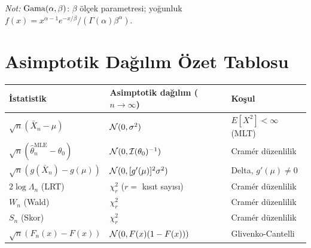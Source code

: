 \noindent\textit{Not:} $\operatorname{Gama}(\alpha,\beta)$: $\beta$ ölçek parametresi; yoğunluk $f(x)=x^{\alpha-1}e^{-x/\beta}/(\Gamma(\alpha)\beta^\alpha)$.

\section{Asimptotik Dağılım Özet Tablosu}
\label{app:asimptotik_tablo}

\begin{center}
\renewcommand{\arraystretch}{1.4}
\begin{tabular}{lll}
\hline
\textbf{İstatistik} & \textbf{Asimptotik dağılım} ($n\to\infty$) & \textbf{Koşul} \\
\hline
$\sqrt{n}(\bar X_n-\mu)$ & $\mathcal{N}(0,\sigma^2)$ & $E[X^2]<\infty$ (MLT) \\
$\sqrt{n}(\hat\theta_n^\mathrm{MLE}-\theta_0)$ & $\mathcal{N}(0,\mathcal{I}(\theta_0)^{-1})$ & Cramér düzenlilik \\
$\sqrt{n}(g(\bar X_n)-g(\mu))$ & $\mathcal{N}(0,[g'(\mu)]^2\sigma^2)$ & Delta, $g'(\mu)\neq0$ \\
$2\log\Lambda_n$ (LRT) & $\chi^2_r$ ($r=$ kısıt sayısı) & Cramér düzenlilik \\
$W_n$ (Wald) & $\chi^2_r$ & Cramér düzenlilik \\
$S_n$ (Skor) & $\chi^2_r$ & Cramér düzenlilik \\
$\sqrt{n}(F_n(x)-F(x))$ & $\mathcal{N}(0,F(x)(1-F(x)))$ & Glivenko-Cantelli \\
\hline
\end{tabular}
\end{center}

